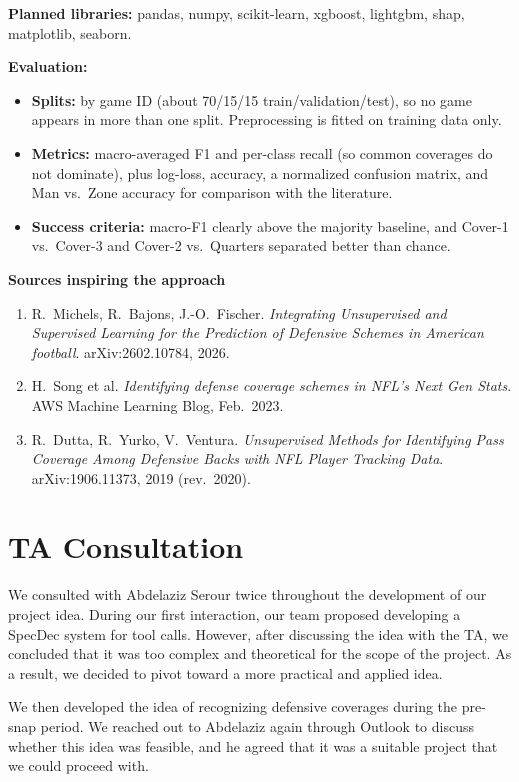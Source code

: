 \documentclass[12pt]{article}
\begin{document}
\textbf{Planned libraries:} pandas, numpy, scikit-learn, xgboost, lightgbm, shap, matplotlib, seaborn.

\textbf{Evaluation:}
\begin{itemize}
  \item \textbf{Splits:} by game ID (about 70/15/15 train/validation/test), so no game appears in more than one split. Preprocessing is fitted on training data only.
  \item \textbf{Metrics:} macro-averaged F1 and per-class recall (so common coverages do not dominate), plus log-loss, accuracy, a normalized confusion matrix, and Man vs.\ Zone accuracy for comparison with the literature.
  \item \textbf{Success criteria:} macro-F1 clearly above the majority baseline, and Cover-1 vs.\ Cover-3 and Cover-2 vs.\ Quarters separated better than chance.
\end{itemize}

\textbf{Sources inspiring the approach}
\begin{enumerate}
  \item R.\ Michels, R.\ Bajons, J.-O.\ Fischer. \textit{Integrating Unsupervised and Supervised Learning for the Prediction of Defensive Schemes in American football}. arXiv:2602.10784, 2026.
  \item H.\ Song et al. \textit{Identifying defense coverage schemes in NFL's Next Gen Stats}. AWS Machine Learning Blog, Feb.\ 2023.
  \item R.\ Dutta, R.\ Yurko, V.\ Ventura. \textit{Unsupervised Methods for Identifying Pass Coverage Among Defensive Backs with NFL Player Tracking Data}. arXiv:1906.11373, 2019 (rev.\ 2020).
\end{enumerate}

\section*{TA Consultation}

We consulted with Abdelaziz Serour twice throughout the development of our project idea. During our first interaction, our team proposed developing 
a SpecDec system for tool calls. However, after discussing the idea with the TA, we concluded that it was too complex and theoretical for
the scope of the project. As a result, we decided to pivot toward a more practical and applied idea.

We then developed the idea of recognizing defensive coverages during the pre-snap period. We reached out to Abdelaziz again through Outlook 
to discuss whether this idea was feasible, and he agreed that it was a suitable project that we could proceed with.
\end{document}
